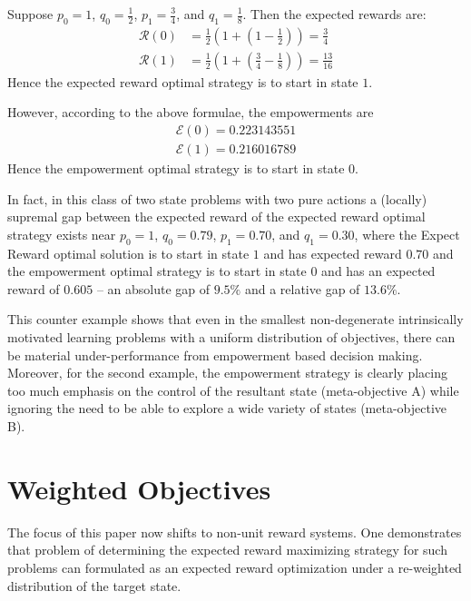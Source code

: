 \documentclass{article}
\newcommand{\Ee}{\mathcal{E}}
\newcommand{\Rr}{\mathcal{R}}
\begin{document}
Suppose $p_0=1$, $q_0=\frac{1}{2}$, $p_1=\frac{3}{4}$, and $q_1 = \frac{1}{8}$. Then the expected rewards are:
\begin{align*}
\Rr(0) &= \frac{1}{2}\left(1+\left(1-\frac{1}{2}\right)\right)=\frac{3}{4}\\
\Rr(1) &= \frac{1}{2}\left(1+\left(\frac{3}{4}-\frac{1}{8}\right)\right)=\frac{13}{16}
\end{align*}
Hence the expected reward optimal strategy is to start in state $1$.

However, according to the above formulae, the empowerments are
\begin{align*}
\Ee(0)=0.223143551\\
\Ee(1)=0.216016789 
\end{align*}
Hence the empowerment optimal strategy is to start in state $0$.

In fact, in this class of two state problems with two pure actions a (locally) supremal gap between the expected reward of the expected reward optimal strategy exists near $p_0=1$, $q_0=0.79$, $p_1=0.70$, and $q_1 = 0.30$, where the Expect Reward optimal solution is to start in state $1$ and has expected reward $0.70$ and the empowerment optimal strategy is to start in state $0$ and has an expected reward of $0.605$ -- an absolute gap of $9.5\%$ and a relative gap of $13.6\%$.

This counter example shows that even in the smallest non-degenerate intrinsically motivated learning problems with a uniform distribution of objectives, there can be material under-performance from empowerment based decision making. Moreover, for the second example, the empowerment strategy is clearly placing too much emphasis on the control of the resultant state (meta-objective A) while ignoring the need to be able to explore a wide variety of states (meta-objective B).
\section{Weighted Objectives}
The focus of this paper now shifts to non-unit reward systems. One demonstrates that problem of determining the expected reward maximizing strategy for such problems can formulated as an expected reward optimization under a re-weighted distribution of the target state.\\
\end{document}
